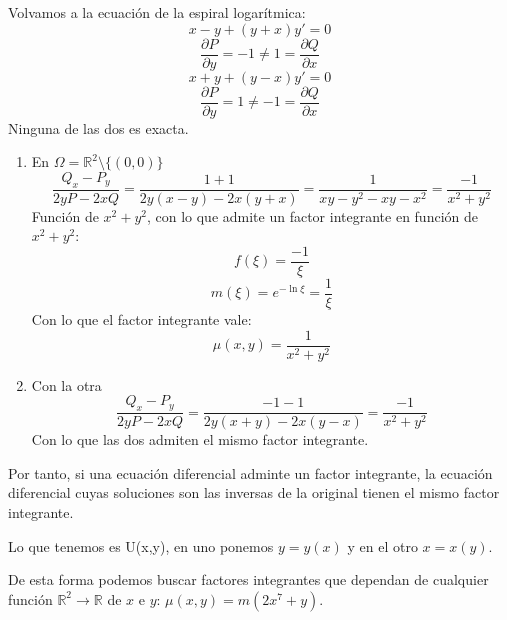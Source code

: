 \begin{ejemplo}
    Volvamos a la ecuación de la espiral logarítmica:
    \begin{equation*}
        x-y + (y+x)y' = 0
    \end{equation*}
    \begin{equation*}
        \dfrac{\partial P}{\partial y} = -1 \neq 1 = \dfrac{\partial Q}{\partial x}
    \end{equation*}
    \begin{equation*}
        x+y + (y-x)y' = 0
    \end{equation*}
    \begin{equation*}
        \dfrac{\partial P}{\partial y} = 1 \neq -1 = \dfrac{\partial Q}{\partial x}
    \end{equation*}
    Ninguna de las dos es exacta.

    \begin{enumerate}
        \item En $\Omega = \mathbb{R}^2\setminus\{(0,0)\}$
            \begin{equation*}
                \dfrac{Q_x - P_y}{2yP - 2xQ} = \dfrac{1+1}{2y(x-y)-2x(y+x)} = \dfrac{1}{xy-y^2 - xy -x^2} = \dfrac{-1}{x^2+y^2}
            \end{equation*}
            Función de $x^2+y^2$, con lo que admite un factor integrante en función de $x^2+y^2$:
            \begin{equation*}
                f(\xi) = \dfrac{-1}{\xi}
            \end{equation*}
            \begin{equation*}
                m(\xi) = e^{-\ln\xi} = \dfrac{1}{\xi}
            \end{equation*}
            Con lo que el factor integrante vale:
            \begin{equation*}
                \mu(x,y) = \dfrac{1}{x^2+y^2}
            \end{equation*}
        \item Con la otra
            \begin{equation*}
                \dfrac{Q_x - P_y}{2yP - 2xQ} = \dfrac{-1-1}{2y(x+y)-2x(y-x)} = \dfrac{-1}{x^2 + y^2}
            \end{equation*}
            Con lo que las dos admiten el mismo factor integrante.
    \end{enumerate}
    Por tanto, si una ecuación diferencial adminte un factor integrante, la ecuación diferencial cuyas soluciones son las inversas de la original tienen el mismo factor integrante.
    
    Lo que tenemos es U(x,y), en uno ponemos $y=y(x)$ y en el otro $x=x(y)$.
\end{ejemplo}

De esta forma podemos buscar factores integrantes que dependan de cualquier función $\mathbb{R}^2\rightarrow\mathbb{R}$ de $x$ e $y$: $\mu(x,y) = m(2x^7 + y)$.
